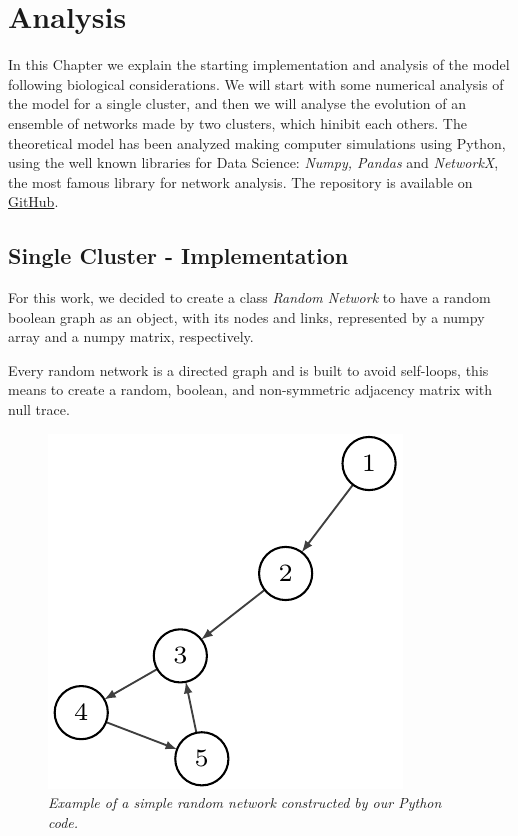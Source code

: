\chapter{Analysis}\label{analysis}
\lhead[\fancyplain{}{\bfseries\thepage}]{\fancyplain{}{\bfseries\rightmark}}

In this Chapter we explain the starting implementation and analysis of the model following biological considerations.
We will start with some numerical analysis of the model for a single cluster, and then we will analyse the evolution of an ensemble of networks made by two clusters, which hinibit each others.
The theoretical model has been analyzed making computer simulations using Python, using the well known libraries for Data Science: \emph{Numpy, Pandas} and  \emph{NetworkX}, the most famous library for network analysis. The repository is available on \href{https://github.com/riccardoscheda/thesis}{GitHub}.

\section{Single Cluster - Implementation}

For this work, we decided to create a class \emph{Random Network} to have a random boolean graph as an object, with its nodes and links, represented by a numpy array and a numpy matrix, respectively.

Every random network is a directed graph and is built to avoid self-loops, this means to create a random, boolean, and non-symmetric adjacency matrix with null trace.
\begin{figure}
\centering
\includegraphics[scale=1]{images/singlecluster}
\caption{\emph{Example of a simple random network constructed by our Python code.}}
\label{fig:ne}
\end{figure}

